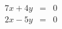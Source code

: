\documentclass[a4paper,10pt, leqno]{article}
\begin{document}
   \begin{eqnarray}
   7x + 4y & =  & 0 \\
   2x - 5y & =  & 0
    \end{eqnarray}
\end{document}

